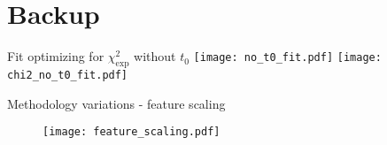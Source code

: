 
\appendix

\section{Backup}

\begin{frame}[t]{Fit optimizing for $\chi^2_\mathrm{exp}$ without $t_0$}
  \centering
  \texttt{[image: no\_t0\_fit.pdf]}
  \texttt{[image: chi2\_no\_t0\_fit.pdf]}
\end{frame}

\begin{frame}[t]{Methodology variations - feature scaling}
  \begin{figure}
    \centering
    \texttt{[image: feature\_scaling.pdf]}
  \end{figure}
\end{frame}
